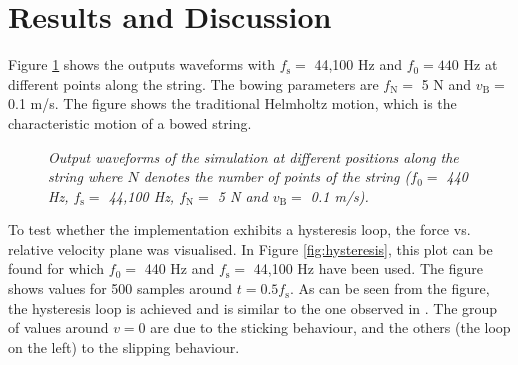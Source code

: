 \documentclass[twoside,a4paper,dvipsnames]{article}
\begin{document}
\section{Results and Discussion}\label{sec:results}

Figure \ref{fig:output44100} shows the outputs waveforms with $f_\text{s} =$ 44,100 Hz and $f_0 = 440$ Hz at different points along the string. The bowing parameters are $f_\text{N} =$ 5 N and $v_\text{B} =$ 0.1 m/s. The figure shows the traditional Helmholtz motion, which is the characteristic motion of a bowed string.

\begin{figure}[h]
  \centering
  \caption{\it Output waveforms of the simulation at different positions along the string where $N$ denotes the number of points of the string ($f_0 =$ 440 Hz, $f_\text{s} =$ 44,100 Hz, $f_\text{N} =$ 5 N and $v_\text{B} =$ 0.1 m/s). \label{fig:output44100}}
\end{figure}

To test whether the implementation exhibits a hysteresis loop, the force vs. relative velocity plane was visualised. In Figure \ref{fig:hysteresis}, this plot can be found for which $f_0 =$ 440 Hz and $f_\text{s} =$ 44,100 Hz have been used. The figure shows values for 500 samples around $t = 0.5f_\text{s}$. As can be seen from the figure, the hysteresis loop is achieved and is similar to the one observed in \cite{Smith2000}. The group of values around $v=0$ are due to the sticking behaviour, and the others (the loop on the left) to the slipping behaviour.
\end{document}
